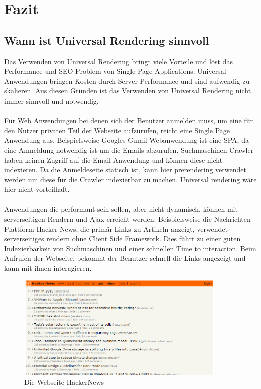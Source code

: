 \documentclass[runningheads]{llncs}
\begin{document}
\section{Fazit}
\label{sec:Fazit}

\subsection{Wann ist Universal Rendering sinnvoll}
\label{subsec:Wann ist Universal Rendering sinnvoll}
Das Verwenden von Universal Rendering bringt viele Vorteile und 
löst das Performance und SEO Problem von Single Page Applications. 
Universal Anwendungen bringen Kosten durch Server Performance und sind aufwendig zu skalieren. 
Aus diesen Gründen ist das Verwenden von Universal Rendering nicht immer sinnvoll und notwendig.
\\
\\
Für Web Anwendungen bei denen sich der Benutzer anmelden muss, 
um eine für den Nutzer privaten Teil der Webseite aufzurufen, 
reicht eine Single Page Anwendung aus. 
Beispielsweise Googles Gmail Webanwendung ist eine SPA, 
da eine Anmeldung notwendig ist um die Emails abzurufen. 
Suchmaschinen Crawler haben keinen Zugriff auf die Email-Anwendung und 
können diese nicht indexieren. 
Da die Anmeldeseite statisch ist, 
kann hier prerendering verwendet werden um diese für die Crawler indexierbar zu machen. 
Universal rendering wäre hier nicht vorteilhaft.
\\
\\
Anwendungen die performant sein sollen, 
aber nicht dynamisch, können mit serverseitigen Rendern und 
Ajax erreicht werden. Beispielsweise die Nachrichten Plattform Hacker News, 
die primär Links zu Artikeln anzeigt, 
verwendet serverseitiges rendern ohne Client Side Framework. 
Dies führt zu einer guten Indexierbarkeit von Suchmaschinen und 
einer schnellen Time to interaction. Beim Aufrufen der Webseite, 
bekommt der Benutzer schnell die Links angezeigt und 
kann mit ihnen interagieren. 
\begin{figure}
  \centering
  \includegraphics[width=10cm]{images/HackerNews}
  \caption{Die Webseite HackerNews}
  \label{Die WEbseite HackerNews}
\end{figure}
\end{document}
